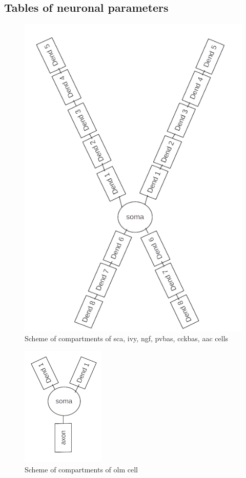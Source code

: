\documentclass[a4paper,12pt]{article}
\begin{document}
\subsection{Tables of neuronal parameters} \label{tables_of_neurons}










\begin{figure}[h]
	 \centering
\includegraphics{interneuron_structures.png}
	\caption{Scheme of compartments of sca, ivy, ngf, pvbas, cckbas, aac cells}
	\label{fig:interneuron_structures}
\end{figure}


\begin{figure}[h]
	\centering
\includegraphics{olm_structure.png}
\caption{Scheme of compartments of olm cell}
\label{fig:olm_structures}
\end{figure}
\end{document}
